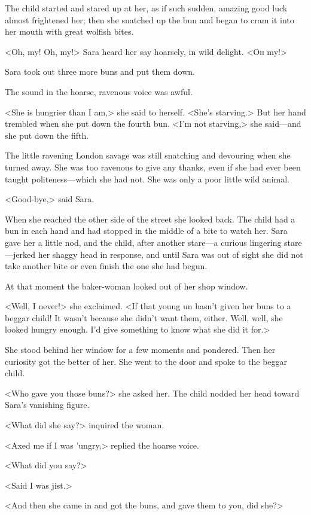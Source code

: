 The child started and stared up at her, as if such sudden, amazing good luck almost frightened her; then she snatched up the bun and began to cram it into her mouth with great wolfish bites.

<Oh, my! Oh, my!> Sara heard her say hoarsely, in wild delight. <\textsc{Oh} my!>

Sara took out three more buns and put them down.

The sound in the hoarse, ravenous voice was awful.

<She is hungrier than I am,> she said to herself. <She's starving.> But her hand trembled when she put down the fourth bun. <I'm not starving,> she said—and she put down the fifth.

The little ravening London savage was still snatching and devouring when she turned away. She was too ravenous to give any thanks, even if she had ever been taught politeness—which she had not. She was only a poor little wild animal.

<Good-bye,> said Sara.

When she reached the other side of the street she looked back. The child had a bun in each hand and had stopped in the middle of a bite to watch her. Sara gave her a little nod, and the child, after another stare—a curious lingering stare—jerked her shaggy head in response, and until Sara was out of sight she did not take another bite or even finish the one she had begun.

At that moment the baker-woman looked out of her shop window.

<Well, I never!> she exclaimed. <If that young un hasn't given her buns to a beggar child! It wasn't because she didn't want them, either. Well, well, she looked hungry enough. I'd give something to know what she did it for.>

She stood behind her window for a few moments and pondered. Then her curiosity got the better of her. She went to the door and spoke to the beggar child.

<Who gave you those buns?> she asked her. The child nodded her head toward Sara's vanishing figure.

<What did she say?> inquired the woman.

<Axed me if I was 'ungry,> replied the hoarse voice.

<What did you say?>

<Said I was jist.>

<And then she came in and got the buns, and gave them to you, did she?>

